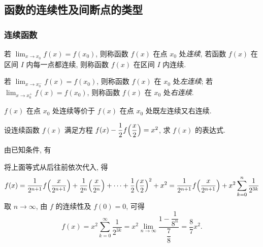 \subsection{函数的连续性及间断点的类型}

\subsubsection{连续函数}

\begin{definition}[函数连续]
    若 $\displaystyle\lim_{x\to x_0}f(x)=f(x_0)$, 则称函数 $f(x)$ 在点 $x_0$ 处\textit{连续}, 若函数 $f(x)$ 在区间 $ I $ 内每一点都连续, 则称函数 $f(x)$ 在区间 $I$ 内连续.
\end{definition}

\begin{definition}[单侧连续]
    若 $\displaystyle\lim_{x\to x_0^-}f(x)=f(x_0)$, 则称函数 $f(x)$ 在 $x_0$ 处\textit{左连续}; 若 $\displaystyle\lim_{x\to x_0^+}f(x)=f(x_0)$, 则称函数 $f(x)$ 在 $x_0$ 处\textit{右连续}.
    \label{unilateral continuous}
\end{definition}

\begin{theorem}[函数连续的充要条件]
    $f(x)$ 在点 $x_0$ 处连续等价于 $f(x)$  在点 $x_0$ 处既左连续又右连续.
\end{theorem}

\begin{example}
    设连续函数 $f(x)$ 满足方程 $f(x)-\dfrac{1}{2}f\qty(\dfrac{x}{2})=x^2$, 求 $f(x)$ 的表达式.
\end{example}
\begin{solution}
    由已知条件, 有 
    将上面等式从后往前依次代入, 得 
    $$
    f(x)=\dfrac{1}{2^{n+1}}f\qty(\dfrac{x}{2^{n+1}})+\dfrac{1}{2^{n}}\qty(\dfrac{x}{2^{n}})+ \cdots +\dfrac{1}{2}\qty(\dfrac{x}{2})^2+x^2=\dfrac{1}{2^{n+1}}f\qty(\dfrac{x}{2^{n+1}})+x^2\sum_{k=0}^{n} \dfrac{1}{2^{3k}}
    $$
    取 $n\to \infty$, 由 $f$ 的连续性及 $f(0)=0$, 可得
    $$
    f(x)=x^2\sum_{k=0}^{\infty} \dfrac{1}{2^{3k}}=x^2\lim_{n\to \infty}\dfrac{1-\dfrac{1}{8^{n}}}{\dfrac{7}{8}}=\dfrac{8}{7}x^2.
    $$
\end{solution}

